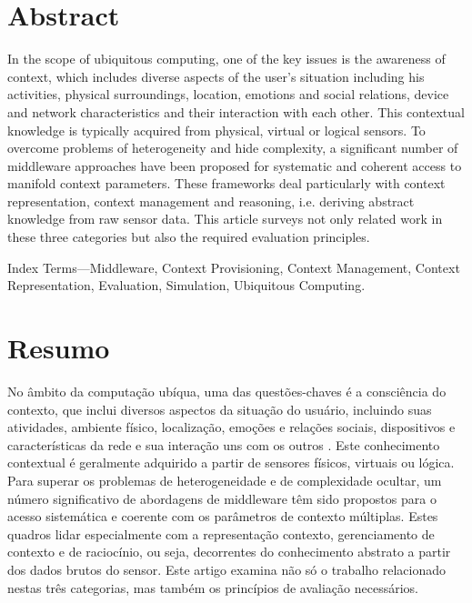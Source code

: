 \documentclass[12pt]{article} %
\begin{document}
\section{Abstract} %

In the scope of ubiquitous computing, one of the key issues is the awareness of context, which includes diverse aspects of the user’s situation including his activities, physical surroundings, location, emotions and social relations, device and network characteristics and their interaction with each other. This contextual knowledge is typically acquired from physical, virtual or logical sensors. To overcome problems of heterogeneity and hide complexity, a significant number of middleware approaches have been proposed for systematic and coherent access to manifold context parameters. These frameworks deal particularly with context representation, context management and reasoning, i.e. deriving abstract knowledge from raw sensor data. This article surveys not only related work in these three categories but also the required evaluation principles.

Index Terms—Middleware, Context Provisioning, Context Management, Context Representation, Evaluation, Simulation, Ubiquitous Computing.



\section{Resumo} %

No âmbito da computação ubíqua, uma das questões-chaves é a consciência do contexto, que inclui diversos aspectos da situação do usuário, incluindo suas atividades, ambiente físico, localização, emoções e relações sociais, dispositivos e características da rede e sua interação uns com os outros . Este conhecimento contextual é geralmente adquirido a partir de sensores físicos, virtuais ou lógica. Para superar os problemas de heterogeneidade e de complexidade ocultar, um número significativo de abordagens de middleware têm sido propostos para o acesso sistemática e coerente com os parâmetros de contexto múltiplas. Estes quadros lidar especialmente com a representação contexto, gerenciamento de contexto e de raciocínio, ou seja, decorrentes do conhecimento abstrato a partir dos dados brutos do sensor. Este artigo examina não só o trabalho relacionado nestas três categorias, mas também os princípios de avaliação necessários.
\end{document}
